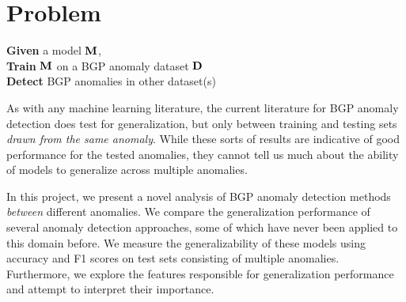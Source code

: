 \section{Problem}
\begin{tcolorbox}
\textbf{Given} a model $\textbf{M}$, \\
\textbf{Train} $\textbf{M}$ on a BGP anomaly dataset $\textbf{D}$ \\
\textbf{Detect} BGP anomalies in other dataset(s)
\end{tcolorbox}

As with any machine learning literature, the current literature for BGP anomaly detection does test for generalization, but only between training and testing sets \textit{drawn from the same anomaly}. While these sorts of results are indicative of good performance for the tested anomalies, they cannot tell us much about the ability of models to generalize across multiple anomalies.

In this project, we present a novel analysis of BGP anomaly detection methods \textit{between} different anomalies. We compare the generalization performance of several anomaly detection approaches, some of which have never been applied to this domain before. We measure the generalizability of these models using accuracy and F1 scores on test sets consisting of multiple anomalies. Furthermore, we explore the features responsible for generalization performance and attempt to interpret their importance.


